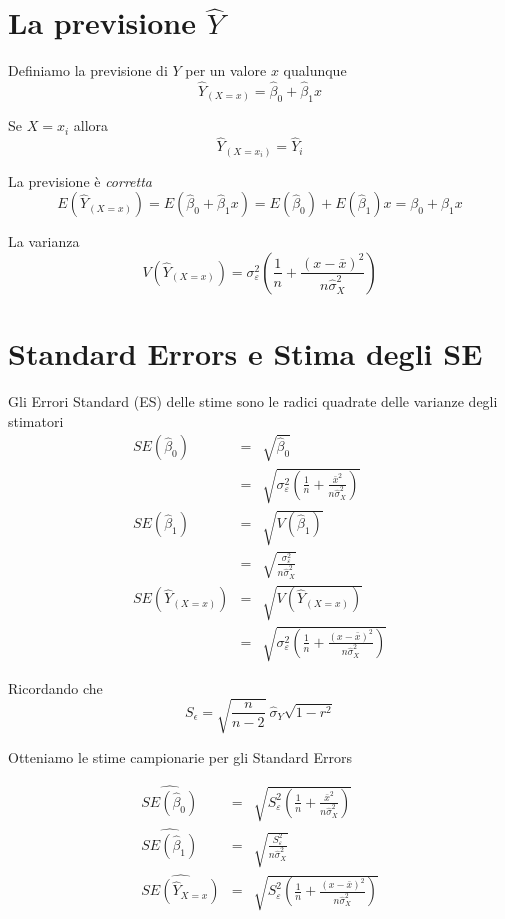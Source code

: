 \documentclass[
  11pt,
]{book}
\theoremstyle{mytheoremstyle}
\theoremstyle{mydefstyle}
\begin{document}
\section{\texorpdfstring{La previsione \(\hat Y\)}{La previsione \textbackslash hat Y}}\label{la-previsione-hat-y}

Definiamo la previsione di \(Y\) per un valore \(x\) qualunque
\[\hat Y_{(X=x)}=\hat\beta_0+\hat\beta_1x\]

Se \(X=x_i\) allora
\[\hat Y_{(X=x_i)}=\hat Y_i\]

La previsione è \emph{corretta}
\[E\left(\hat Y_{(X=x)}\right)=E(\hat\beta_0+\hat\beta_1x)=E(\hat\beta_0)+E(\hat\beta_1)x=\beta_0+\beta_1x\]

La varianza
\[V(\widehat{Y}_{(X=x)}) = \sigma_{\varepsilon}^{2} \left( \frac{1} {n}  +  \frac{(x - \bar{x})^{2}} {n \hat{\sigma}^{2}_{X}} \right)\]

\section{Standard Errors e Stima degli SE}\label{standard-errors-e-stima-degli-se}

Gli Errori Standard (ES) delle stime sono le radici quadrate
delle varianze degli stimatori
\begin{eqnarray*}
SE(\hat\beta_{0})           &=& \sqrt{\hat\beta_{0}}           \\
                            &=& \sqrt{\sigma_{\varepsilon}^{2}\left( \frac{1} {n} +
   \frac{\bar{x}^{2}} {n\hat{\sigma}^{2}_{X}} \right)}\\
SE(\hat\beta_{1})           &=& \sqrt{V(\hat\beta_{1})}           \\
&=&\sqrt{\frac{\sigma_{\varepsilon}^{2}} {n\hat{\sigma}^{2}_{X}} }\\
SE(\widehat{Y}_{(X=x)}) &=& \sqrt{V(\widehat{Y}_{(X=x)})} \\
 &=& \sqrt{\sigma_{\varepsilon}^{2}\left( \frac{1} {n} +
   \frac{(x - \bar{x})^{2}} {n\hat{\sigma}^{2}_{X}} \right)}
\end{eqnarray*}

Ricordando che
\[S_{\epsilon}  = \sqrt{\frac{n} {n-2}}\ \hat{\sigma}_{Y}\sqrt{1 - r^2}\]

Otteniamo le stime campionarie per gli Standard Errors

\begin{info}
\begin{eqnarray*}
\widehat{SE(\hat\beta_{0})} &=& \sqrt{S_{\varepsilon}^{2} \left( \frac{1} {n} +  \frac{\bar{x}^{2}} {n \hat{\sigma}^{2}_{X}} \right)}\\
\widehat{SE(\hat\beta_{1})}           &=& \sqrt{\frac{S_{\varepsilon}^{2}} {n\hat{\sigma}^{2}_{X}} }\\
\widehat{SE(\widehat{Y}_{X=x})}&=& \sqrt{S_{\varepsilon}^{2}\left( \frac{1} {n} +  \frac{(x - \bar{x})^{2}} {n\hat{\sigma}^{2}_{X}} \right)}
\end{eqnarray*}

\end{info}
\end{document}
